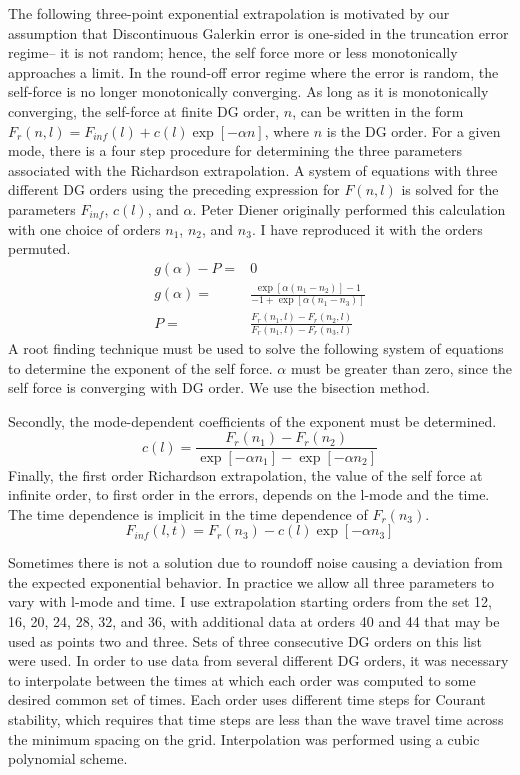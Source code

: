 The following three-point exponential extrapolation is motivated by our assumption that Discontinuous Galerkin error is one-sided in the truncation error regime-- it is not random; hence, the self force more or less monotonically approaches a limit. In the round-off error regime where the error is random, the self-force is no longer monotonically converging. As long as it is monotonically converging, the self-force at finite DG order, $n$, can be written in the form $F_r(n,l)=F_{inf}(l)+c(l)\exp[-\alpha n]$, where $n$ is the DG order. For a given mode, there is a four step procedure for determining the three parameters associated with the Richardson extrapolation. A system of equations with three different DG orders using the preceding expression for $F(n,l)$ is solved for the parameters $F_{inf}$, $c(l)$, and $\alpha$. Peter Diener originally performed this calculation with one choice of orders $n_1$, $n_2$, and $n_3$. I have reproduced it with the orders permuted.
\begin{eqnarray}
g(\alpha)-P=&0\\
g(\alpha)=&\frac{\exp[\alpha(n_1-n_2)]-1}{-1+\exp[\alpha(n_1-n_3)]}\\
P=&\frac{F_r(n_1,l)-F_r(n_2,l)}{F_r(n_1,l)-F_r(n_3,l)}
\end{eqnarray}
A root finding technique must be used to solve the following system of equations to determine the exponent of the self force. $\alpha$ must be greater than zero, since the self force is converging with DG order. We use the bisection method. 

Secondly, the mode-dependent coefficients of the exponent must be determined.
\begin{equation}
c(l)=\frac{F_r(n_1)-F_r(n_2)}{\exp[-\alpha n_1]-\exp[-\alpha n_2]}
\end{equation}
Finally, the first order Richardson extrapolation, the value of the self force at infinite order, to first order in the errors, depends on the l-mode and the time. The time dependence is implicit in the time dependence of $F_r(n_3)$. 
\begin{equation}
F_{inf}(l,t)=F_r(n_3)-c(l)\exp[-\alpha n_3]
\end{equation}

Sometimes there is not a solution due to roundoff noise causing a deviation from the expected exponential behavior. In practice we allow all three parameters to vary with l-mode and time. I use extrapolation starting orders from the set 12, 16, 20, 24, 28, 32, and 36, with additional data at orders 40 and 44 that may be used as points two and three. Sets of three consecutive DG orders on this list were used. In order to use data from several different DG orders, it was necessary to interpolate between the times at which each order was computed to some desired common set of times. Each order uses different time steps for Courant stability, which requires that time steps are less than the wave travel time across the minimum spacing on the grid. Interpolation was performed using a cubic polynomial scheme. 


